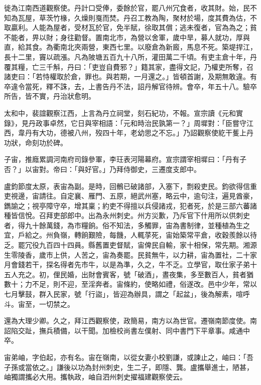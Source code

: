 \begin{pinyinscope}
 徙為江南西道觀察使。丹計口受俸，委餘於官，罷八州冗食者，收其財。始，民不知為瓦屋，草茨竹椽，久燥則戛而焚。丹召工教為陶，聚材於場，度其費為估，不取贏利。人能為屋者，受材瓦於官，免半賦，徐取其償；逃未復者，官為為之；貧不能者，畀以財；身往勸督。置南北市，為營以舍軍，歲中旱，募人就功，厚與直，給其食。為衢南北夾兩營，東西七里。以廢倉為新廄，馬息不死。築堤捍江，長十二里，竇以疏漲。凡為陂塘五百九十八所，灌田萬二千頃。有吏主倉十年，丹覆其糧，亡三千斛，丹曰：「吏豈自費邪？」籍其家，盡得文記，乃權吏所奪，召諸吏曰：「若恃權取於倉，罪也。與若期，一月還之。」皆頓首謝，及期無敢違。有卒違令當死，釋不誅，去，上書告丹不法，詔丹解官待辨。會卒，年五十八。驗卒所告，皆不實，丹治狀愈明。



 太和中，裴誼觀察江西，上言為丹立祠堂，刻石紀功，不報。宣宗讀《元和實錄》，見丹政事卓然，它日與宰相語：「元和時治民孰第一？」周墀對：「臣嘗守江西，韋丹有大功，德被八州，歿四十年，老幼思之不忘。」乃詔觀察使紇干蒦上丹功狀，命刻功於碑。



 子宙，推廕累調河南府司錄參軍，李玨表河陽幕府。宣宗謂宰相墀曰：「丹有子否？」以宙對。帝曰：「與好官。」乃拜侍御史，三遷度支郎中。


盧鈞節度太原，表宙為副。是時，回鶻已破諸部，入塞下，剽殺吏民。鈞欲得信重吏視邊，宙請往。自定襄、雁門、五原，絕武州塞，略云中，逾句注，遍見酋豪，鐫諭之；視亭障守卒，增其稟；約吏不得擅以兵侵諸戎，犯者死，於是三部六蕃諸種皆信悅。召拜吏部郎中。出為永州刺史。州方災歉，乃斥官下什用所以供刺史者，得九十餘萬錢，為市糧餉。俗不知法，多觸罪，宙為書制律，並種植為生之宜，戶給之。州負嶺，轉餉艱險，每饑，人輒莩死，宙始築常平倉，收穀羨餘以待乏。罷冗役九百四十四員。縣舊置吏督賦，宙俾民自輸，家十相保，常先期。湘源生零陵香，歲市上供，人苦之，宙為奏罷。民貧無牛，以力耕，宙為置社，二十家月會錢若干，探名得者先市牛，以是為準，久之，牛不乏。立學官，取仕家子弟十五人充之。初，俚民婚，出財會賓客，號「破酒」，晝夜集，多至數百人，貧者猶數十；力不足，則不迎，至淫奔者。宙條約，使略如禮，俗遂改。邑中少年，常以七月擊鼓，群入民家，號「行盜」，皆迎為辦具，謂之「起盆」，後為解素，喧呼
 斗。宙至，一切禁之。



 還為大理少卿。久之，拜江西觀察使，政簡易，南方以為世官。遷嶺南節度使。南詔陷交趾，撫兵積備，以干聞。加檢校尚書左僕射、同中書門下平章事。咸通中卒。



 宙弟岫，字伯起，亦有名。宙在嶺南，以從女妻小校劉謙，或諫止之，岫曰：「吾子孫或當依之。」謙後以功為封州刺史，生二子，即隱、龔。盧攜舉進士，陋甚，岫獨謂攜必大用。攜執政，岫自泗州刺史擢福建觀察使云。




\end{pinyinscope}
